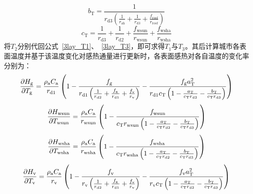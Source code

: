%
\begin{equation}
  b_{\mathrm{T}} = \frac{1}{r_{\mathrm{d3}} \left(\frac{1}{r_{\mathrm{ah}}} + \frac{1}{r_{\mathrm{d3}}} + \frac{f_{\mathrm{roof}}}{r_{\mathrm{roof}}} \right)}
\end{equation}
%
\begin{equation}
  c_{\mathrm{T}} = \frac{1}{r_{\mathrm{d3}}} + \frac{1}{r_{\mathrm{d2}}} + \frac{f_{\mathrm{wsun}}}{r_{\mathrm{wsun}}} + \frac{f_{\mathrm{wsha}}}{r_{\mathrm{wsha}}}
\end{equation}
将$T_{\mathrm{2}}$分别代回公式~\eqref{3lay_T1}、~\eqref{3lay_T3}，即可求得$T_{\mathrm{1}}$与$T_{\mathrm{3}}$。其后计算城市各表面温度并基于该温度变化对感热通量进行更新时，各表面感热对各自温度的变化率分别为：
\begin{equation}
  \frac{\partial H_{\mathrm{g}}}{\partial T_{\mathrm{g}}} = \frac{\rho _{\rm a} C_{\mathrm a}}{r_{\mathrm{d1}}} \left(1-\frac{f_{\rm g}}{r_{\mathrm{d1}} \left(\frac{1}{r_{\mathrm{d2}}}+\frac{f_{\rm g}}{r_{\mathrm{d1}}}+\frac{f_{\rm v}}{r_{\rm v}}\right)} - \frac{f_{\rm g} a_{\mathrm{T}}^2}{r_{\mathrm{d1}} c_{\mathrm{T}} \left(1-\frac{a_{\mathrm{T}}}{c_{\mathrm{T}} r_{\mathrm{d2}}}-\frac{b_{\mathrm{T}}}{c_{\mathrm{T}} r_{\mathrm{d3}}}\right)}\right)
\end{equation}
%
\begin{equation}
  \frac{\partial H_{\mathrm{wsun}}}{\partial T_{\mathrm{wsun}}} = \frac{\rho _{\rm a} C_{\mathrm a}}{r_{\mathrm{wsun}}} \left(1-\frac{f_{\mathrm{wsun}}}{c_{\mathrm{T}} r_{\mathrm{wsun}} \left(1-\frac{a_{\mathrm{T}}}{c_{\mathrm{T}} r_{\mathrm{d2}}}-\frac{b_{\mathrm{T}}}{c_{\mathrm{T}} r_{\mathrm{d3}}}\right)}\right)
\end{equation}
%
\begin{equation}
  \frac{\partial H_{\mathrm{wsha}}}{\partial T_{\mathrm{wsha}}} = \frac{\rho _{\rm a} C_{\mathrm a}}{r_{\mathrm{wsha}}} \left(1-\frac{f_{\mathrm{wsha}}}{c_{\mathrm{T}} r_{\mathrm{wsha}} \left(1-\frac{a_{\mathrm{T}}}{c_{\mathrm{T}} r_{\mathrm{d2}}}-\frac{b_{\mathrm{T}}}{c_{\mathrm{T}} r_{\mathrm{d3}}}\right)}\right)
\end{equation}
%
\begin{equation}
  \frac{\partial H_{\mathrm{v}}}{\partial T_{\mathrm{v}}} = \frac{\rho _{\rm a} C_{\mathrm a}}{r_{\mathrm{v}}} \left(1-\frac{f_{\rm v}}{r_{\mathrm{v}} \left(\frac{1}{r_{\mathrm{d2}}}+\frac{f_{\rm g}}{r_{\mathrm{d1}}}+\frac{f_{\rm v}}{r_{\rm v}}\right)} - \frac{f_{\rm v} a_{\mathrm{T}}^2}{r_{\mathrm{v}} c_{\mathrm{T}} \left(1-\frac{a_{\mathrm{T}}}{c_{\mathrm{T}} r_{\mathrm{d2}}}-\frac{b_{\mathrm{T}}}{c_{\mathrm{T}} r_{\mathrm{d3}}}\right)}\right)
\end{equation}
